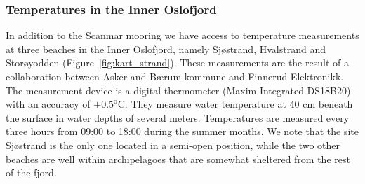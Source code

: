\subsubsection{Temperatures in the Inner Oslofjord}
In addition to the Scanmar mooring we have access to temperature measurements at three beaches in the Inner Oslofjord, namely Sj{\o}strand, Hvalstrand and Stor{\o}yodden (Figure~\ref{fig:kart_strand}). These measurements are the result of a collaboration between Asker and B{\ae}rum kommune and Finnerud Elektronikk. The measurement device is a digital thermometer (Maxim Integrated DS18B20) with an accuracy of $\pm 0.5^{\textrm{o}}$C. They measure water temperature at 40 cm beneath the surface in water depths of several meters. Temperatures are measured every three hours from 09:00 to 18:00 during the summer months. We note that the site Sj{\o}strand is the only one located in a semi-open position, while the two other beaches are well within archipelagoes that are somewhat sheltered from the rest of the fjord.

